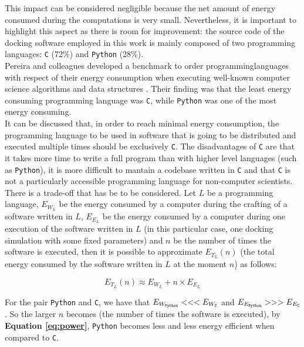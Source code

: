 This impact can be considered negligible because the net amount of energy consumed during the computations is very small. Nevertheless, it is important to highlight this aspect as there is room for improvement: the source code of the docking software employed in this work is mainly composed of two programming languages: \texttt{C} (72\%) and \texttt{Python} (28\%).\\

Pereira and colleagues developed a benchmark to order programming\linebreak languages with respect of their energy consumption when executing well-known computer science algorithms and data structures \cite{pereira_2017}. Their finding was that the least energy consuming programming language was \texttt{C}, while \texttt{Python} was one of the most energy consuming.\\

It can be discussed that, in order to reach minimal energy consumption, the programming language to be used in software that is going to be distributed and executed multiple times should be exclusively \texttt{C}. The disadvantages of \texttt{C} are that it takes more time to write a full program than with higher level languages (such as \texttt{Python}), it is more difficult to mantain a codebase written in \texttt{C} and that \texttt{C} is not a particularly accessible programming language for non-computer scientists.\\

There is a trade-off that has be to be considered. Let $L$ be a programming language, $E_{W_L}$ be the energy consumed by a computer during the crafting of a software written in $L$, $E_{E_L}$ be the energy consumed by a computer during one execution of the software written in $L$ (in this particular case, one docking simulation with some fixed parameters) and $n$ be the number of times the software is executed, then it is possible to approximate $E_{T_L}(n)$ (the total energy consumed by the software written in $L$ at the moment $n$) as follows:

\begin{equation}
    \label{eq:power}
    E_{T_L}(n)\approx E_{W_L} + n\times E_{E_L}         
\end{equation}

For the pair \texttt{Python} and \texttt{C}, we have that $E_{W_\text{\texttt{Python}}} <<< E_{W_\text{\texttt{C}}}$ and $E_{E_\text{\texttt{Python}}} >>> E_{E_\text{\texttt{C}}}$. So the larger $n$ becomes (the number of times the software is executed), by \textbf{Equation \ref{eq:power}}, \texttt{Python} becomes less and less energy efficient when compared to \texttt{C}.\\

